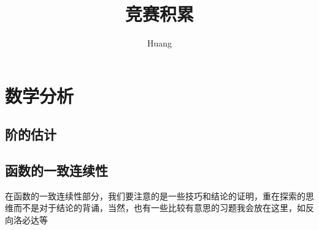 \documentclass[lang=cn,10pt]{elegantbook}
\title{竞赛积累}
\author{ Huang}
\begin{document}
	
	\maketitle
	\frontmatter
	
	\tableofcontents
	
	\mainmatter
	\chapter{数学分析}
	\section{阶的估计}
	\section{函数的一致连续性}
	在函数的一致连续性部分，我们要注意的是一些技巧和结论的证明，重在探索的思维而不是对于结论的背诵，当然，也有一些比较有意思的习题我会放在这里，如反向洛必达等
	
\end{document}
